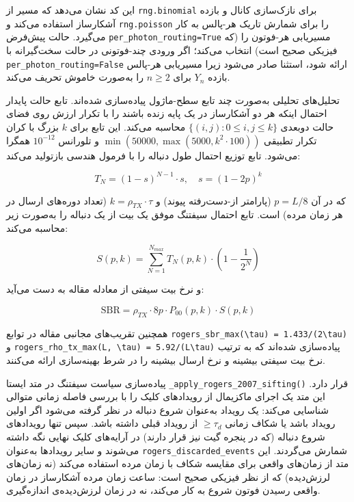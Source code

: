 این کد نشان می‌دهد که مسیر  از \texttt{rng.binomial} برای نازک‌سازی کانال و بازده آشکارساز استفاده می‌کند و \texttt{rng.poisson} را برای شمارش تاریک هر-پالس به کار می‌گیرد. حالت پیش‌فرض \texttt{per\_photon\_routing=True} مسیریابی هر-فوتون را (که فیزیکی صحیح است) انتخاب می‌کند؛ اگر ورودی چند-فوتونی در حالت سخت‌گیرانه با \texttt{per\_photon\_routing=False} ارائه شود، استثنا صادر می‌شود زیرا مسیریابی هر-پالس بازده  $Y_n$ برای $n \geq 2$ را به‌صورت خاموش تحریف می‌کند.

تحلیل‌های تحلیلی  به‌صورت چند تابع سطح-ماژول پیاده‌سازی شده‌اند. تابع 
 حالت پایدار احتمال اینکه هر دو آشکارساز در یک پایه زنده باشند را با تکرار ارزش  روی فضای حالت دوبعدی $\{(i,j): 0 \leq i, j \leq k\}$ محاسبه می‌کند. این تابع برای $k$ بزرگ با کران تکرار تطبیقی $\min(50000, \max(5000, k^2 \cdot 100))$ و تلورانس $10^{-12}$ همگرا می‌شود. تابع توزیع احتمال طول دنباله را با فرمول هندسی بازتولید می‌کند:

\begin{equation}
	T_N = (1 - s)^{N-1} \cdot s, \quad s = (1 - 2p)^k
\end{equation}

که در آن $p = L/8$ (پارامتر از-دست‌رفته پیوند) و $k = \rho_{TX} \cdot \tau$ (تعداد دوره‌های ارسال در هر زمان مرده) است. تابع 
احتمال سيفتنگ موفق یک بیت از یک دنباله را به‌صورت زیر محاسبه می‌کند:

\begin{equation}
	S(p, k) = \sum_{N=1}^{N_{max}} T_N(p, k) \cdot \left(1 - \frac{1}{2^N}\right)
\end{equation}

و نرخ بیت سيفتی  از معادله  مقاله به دست می‌آید:

\begin{equation}
	\text{SBR} = \rho_{TX} \cdot 8p \cdot P_{00}(p, k) \cdot S(p, k)
\end{equation}

همچنین تقریب‌های مجانبی مقاله در توابع \texttt{rogers\_sbr\_max(\textbackslash tau) = 1.433/(2\textbackslash tau)} و \texttt{rogers\_rho\_tx\_max(L, \textbackslash tau) = 5.92/(L\textbackslash tau)} پیاده‌سازی شده‌اند که به ترتیب نرخ بیت سيفتی بیشینه و نرخ ارسال بیشینه را در شرط بهینه‌سازی ارائه می‌کنند.

پیاده‌سازی سیاست سيفتنگ  در متد ایستا \texttt{\_apply\_rogers\_2007\_sifting()} قرار دارد. این متد یک اجرای ماکزیمال از رویدادهای کلیک را با بررسی فاصله زمانی متوالی شناسایی می‌کند: یک رویداد به‌عنوان شروع دنباله در نظر گرفته می‌شود اگر اولین رویداد باشد یا شکاف زمانی $\geq \tau_d$ از رویداد قبلی داشته باشد. سپس تنها رویدادهای شروع دنباله (که در پنجره گیت نیز قرار دارند) در آرایه‌های کلیک نهایی نگه داشته می‌شوند و سایر رویدادها به‌عنوان \texttt{rogers\_discarded\_events} شمارش می‌گردند. این متد از زمان‌های واقعی  برای مقایسه شکاف با زمان مرده استفاده می‌کند (نه زمان‌های لرزش‌دیده) که از نظر فیزیکی صحیح است: ساعت زمان مرده آشکارساز در زمان واقعی رسیدن فوتون شروع به کار می‌کند، نه در زمان لرزش‌دیده‌ی اندازه‌گیری.

